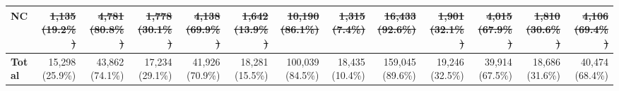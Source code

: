 \begin{table}[htbp]
\begin{tabular}{@{}llrrrrrrrrrrrr@{}}
    \multicolumn{2}{l}{\textbf{NC}} & \sout{1,135 (19.2\%)} & \sout{4,781 (80.8\%)} & \sout{1,778 (30.1\%)} & \sout{4,138 (69.9\%)} & \sout{1,642 (13.9\%)} & \sout{10,190 (86.1\%)} & \sout{1,315 (7.4\%)} & \sout{16,433 (92.6\%)} & \sout{1,901 (32.1\%)} & \sout{4,015 (67.9\%)} & \sout{1,810 (30.6\%)} & \sout{4,106 (69.4\%)} \\
    \midrule
    \multicolumn{2}{l}{\textbf{Total}} & 15,298 (25.9\%) & 43,862 (74.1\%) & 17,234 (29.1\%) & 41,926 (70.9\%) & 18,281 (15.5\%) & 100,039 (84.5\%) & 18,435 (10.4\%) & 159,045 (89.6\%) & 19,246 (32.5\%) & 39,914 (67.5\%) & 18,686 (31.6\%) & 40,474 (68.4\%) \\
    \bottomrule
    \end{tabular}
\end{table}
